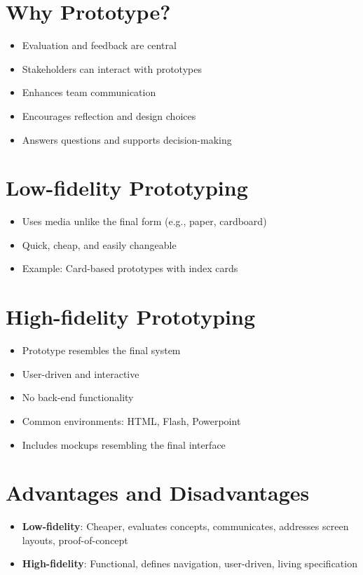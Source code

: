 \documentclass{article}
\begin{document}
\section{Why Prototype?}
\begin{itemize}
    \item Evaluation and feedback are central
    \item Stakeholders can interact with prototypes
    \item Enhances team communication
    \item Encourages reflection and design choices
    \item Answers questions and supports decision-making
\end{itemize}

\section{Low-fidelity Prototyping}
\begin{itemize}
    \item Uses media unlike the final form (e.g., paper, cardboard)
    \item Quick, cheap, and easily changeable
    \item Example: Card-based prototypes with index cards
\end{itemize}

\section{High-fidelity Prototyping}
\begin{itemize}
    \item Prototype resembles the final system
    \item User-driven and interactive
    \item No back-end functionality
    \item Common environments: HTML, Flash, Powerpoint
    \item Includes mockups resembling the final interface
\end{itemize}

\section{Advantages and Disadvantages}
\begin{itemize}
    \item \textbf{Low-fidelity}: Cheaper, evaluates concepts, communicates, addresses screen layouts, proof-of-concept
    \item \textbf{High-fidelity}: Functional, defines navigation, user-driven, living specification
\end{itemize}
\end{document}
